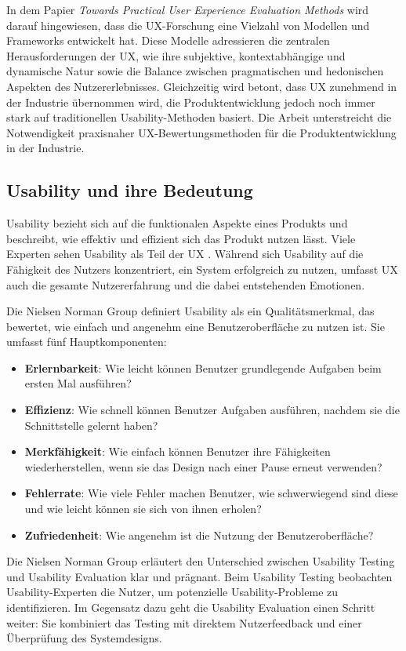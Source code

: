 \documentclass[12pt,oneside]{article}
\begin{document}
In dem Papier \textit{Towards Practical User Experience Evaluation Methods} \cite{evaluationmethods} wird darauf hingewiesen, dass die UX-Forschung eine Vielzahl von Modellen und Frameworks entwickelt hat. Diese Modelle adressieren die zentralen Herausforderungen der UX, wie ihre subjektive, kontextabhängige und dynamische Natur sowie die Balance zwischen pragmatischen und hedonischen Aspekten des Nutzererlebnisses. Gleichzeitig wird betont, dass UX zunehmend in der Industrie übernommen wird, die Produktentwicklung jedoch noch immer stark auf traditionellen Usability-Methoden basiert. Die Arbeit unterstreicht die Notwendigkeit praxisnaher UX-Bewertungsmethoden für die Produktentwicklung in der Industrie.

\subsection{Usability und ihre Bedeutung}

Usability bezieht sich auf die funktionalen Aspekte eines Produkts und beschreibt, wie effektiv und effizient sich das Produkt nutzen lässt. Viele Experten sehen Usability als Teil der UX \cite{GOISTAI}. Während sich Usability auf die Fähigkeit des Nutzers konzentriert, ein System erfolgreich zu nutzen, umfasst UX auch die gesamte Nutzererfahrung und die dabei entstehenden Emotionen.

Die Nielsen Norman Group definiert Usability als ein Qualitätsmerkmal, das bewertet, wie einfach und angenehm eine Benutzeroberfläche zu nutzen ist. Sie umfasst fünf Hauptkomponenten:

\begin{itemize} \item \textbf{Erlernbarkeit}: Wie leicht können Benutzer grundlegende Aufgaben beim ersten Mal ausführen? \item \textbf{Effizienz}: Wie schnell können Benutzer Aufgaben ausführen, nachdem sie die Schnittstelle gelernt haben? \item \textbf{Merkfähigkeit}: Wie einfach können Benutzer ihre Fähigkeiten wiederherstellen, wenn sie das Design nach einer Pause erneut verwenden? \item \textbf{Fehlerrate}: Wie viele Fehler machen Benutzer, wie schwerwiegend sind diese und wie leicht können sie sich von ihnen erholen? \item \textbf{Zufriedenheit}: Wie angenehm ist die Nutzung der Benutzeroberfläche? \end{itemize}
Die Nielsen Norman Group erläutert den Unterschied zwischen Usability Testing und Usability Evaluation klar und prägnant. Beim Usability Testing beobachten Usability-Experten die Nutzer, um potenzielle Usability-Probleme zu identifizieren. Im Gegensatz dazu geht die Usability Evaluation einen Schritt weiter: Sie kombiniert das Testing mit direktem Nutzerfeedback und einer Überprüfung des Systemdesigns.
\end{document}
